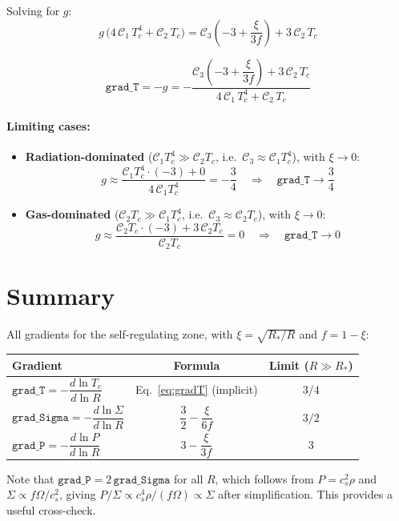 \documentclass[11pt]{article}
\begin{document}
Solving for $g$:
\begin{equation}
    g\,\bigl(4\,\mathcal{C}_1\, T_c^4 + \mathcal{C}_2\, T_c\bigr)
    = \mathcal{C}_3\!\left(-3 + \frac{\xi}{3f}\right) + 3\,\mathcal{C}_2\, T_c
\end{equation}

\begin{equation}
    \boxed{
        \texttt{grad\_T} = -g = -\frac{\mathcal{C}_3\!\left(-3 + \dfrac{\xi}{3f}\right) + 3\,\mathcal{C}_2\, T_c}{4\,\mathcal{C}_1\, T_c^4 + \mathcal{C}_2\, T_c}
    }
    \label{eq:gradT}
\end{equation}

\paragraph{Limiting cases:}
\begin{itemize}
    \item \textbf{Radiation-dominated} ($\mathcal{C}_1 T_c^4 \gg \mathcal{C}_2 T_c$, i.e.\ $\mathcal{C}_3 \approx \mathcal{C}_1 T_c^4$), with $\xi \to 0$:
    \[
        g \approx \frac{\mathcal{C}_1 T_c^4\cdot(-3) + 0}{4\,\mathcal{C}_1 T_c^4} = -\frac{3}{4}
        \quad\Rightarrow\quad \texttt{grad\_T} \to \frac{3}{4}
    \]
    \item \textbf{Gas-dominated} ($\mathcal{C}_2 T_c \gg \mathcal{C}_1 T_c^4$, i.e.\ $\mathcal{C}_3 \approx \mathcal{C}_2 T_c$), with $\xi \to 0$:
    \[
        g \approx \frac{\mathcal{C}_2 T_c\cdot(-3) + 3\,\mathcal{C}_2 T_c}{\mathcal{C}_2 T_c} = 0
        \quad\Rightarrow\quad \texttt{grad\_T} \to 0
    \]
\end{itemize}

\section{Summary}

All gradients for the self-regulating zone, with $\xi = \sqrt{R_*/R}$ and $f = 1 - \xi$:

\begin{center}
\renewcommand{\arraystretch}{2.0}
\begin{tabular}{l c c}
\hline
\textbf{Gradient} & \textbf{Formula} & \textbf{Limit ($R \gg R_*$)} \\
\hline
$\texttt{grad\_T} = -\dfrac{d\ln T_c}{d\ln R}$
    & Eq.~\eqref{eq:gradT} (implicit) & $3/4$ \\[6pt]
$\texttt{grad\_Sigma} = -\dfrac{d\ln\Sigma}{d\ln R}$
    & $\dfrac{3}{2} - \dfrac{\xi}{6f}$ & $3/2$ \\[6pt]
$\texttt{grad\_P} = -\dfrac{d\ln P}{d\ln R}$
    & $3 - \dfrac{\xi}{3f}$ & $3$ \\
\hline
\end{tabular}
\end{center}

Note that $\texttt{grad\_P} = 2\,\texttt{grad\_Sigma}$ for all $R$, which follows from $P = c_s^2\rho$ and $\Sigma \propto f\Omega/c_s^2$, giving $P/\Sigma \propto c_s^4 \rho / (f\Omega) \propto \Sigma$ after simplification. This provides a useful cross-check.
\end{document}
